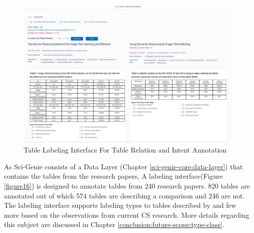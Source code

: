 \begin{figure}[h]
    \centering
    \includegraphics[width=\maxwidth{\textwidth}]{src/images/table-label-interface.png}
    \caption{Table Labeling Interface For Table Relation and Intent Annotation}
    \label{figure\arabic{figurecounter}}
\end{figure}

As Sci-Genie consists of a Data Layer (Chapter \ref{sci-genie-core:data-layer}) that contains the tables from the research papers, A labeling interface(Figure \ref{figure16}) is designed to annotate tables from 240 research papers. 820 tables are annotated out of which 574 tables are describing a comparison and 246 are not. The labeling interface supports labeling types to tables described by \cite{kim2012scientific} and few more based on the observations from current CS research. More details regarding this subject are discussed in Chapter \ref{conclusion:future-scope:type-class}. 

